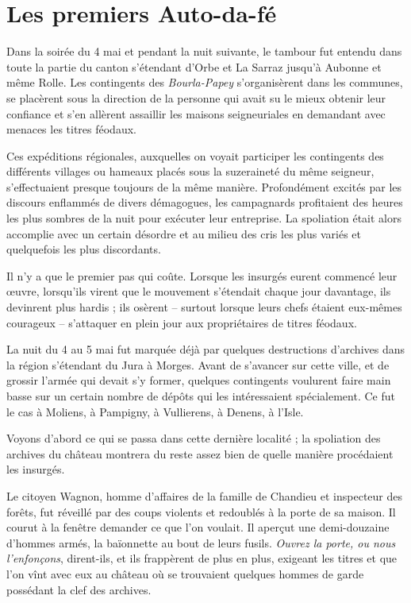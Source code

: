 \documentclass[french,twoside]{book} %
\begin{document}
\section[Les premiers Auto-da-fé]{Les premiers Auto-da-fé}
\noindent Dans la soirée du 4 mai et pendant la nuit suivante, le tambour fut entendu dans toute la partie du canton s’étendant d’Orbe et La Sarraz jusqu’à Aubonne et même Rolle. Les contingents des \emph{Bourla-Papey} s’organisèrent dans les communes, se placèrent sous la direction de la personne qui avait su le mieux obtenir leur confiance et s’en allèrent assaillir les maisons seigneuriales en demandant avec menaces les titres féodaux.\par
Ces expéditions régionales, auxquelles on voyait participer les contingents des différents villages ou hameaux placés sous la suzeraineté du même seigneur, s’effectuaient presque toujours de la même manière. Profondément excités par les discours enflammés de divers démagogues, les campagnards profitaient des heures les plus sombres de la nuit pour exécuter leur entreprise. La spoliation était alors accomplie avec un certain désordre et au milieu des cris les plus variés et quelquefois les plus discordants.\par
Il n’y a que le premier pas qui coûte. Lorsque les insurgés eurent commencé leur œuvre, lorsqu’ils virent que le mouvement s’étendait chaque jour davantage, ils devinrent plus hardis ; ils osèrent – surtout lorsque leurs chefs étaient eux-mêmes courageux – s’attaquer en plein jour aux propriétaires de titres féodaux.\par
La nuit du 4 au 5 mai fut marquée déjà par quelques destructions d’archives dans la région s’étendant du Jura à Morges. Avant de s’avancer sur cette ville, et de grossir l’armée qui devait s’y former, quelques contingents voulurent faire main basse sur un certain nombre de dépôts qui les intéressaient spécialement. Ce fut le cas à Moliens, à Pampigny, à Vullierens, à Denens, à l’Isle.\par
Voyons d’abord ce qui se passa dans cette dernière localité ; la spoliation des archives du château montrera du reste assez bien de quelle manière procédaient les insurgés.\par
Le citoyen Wagnon, homme d’affaires de la famille de Chandieu et inspecteur des forêts, fut réveillé par des coups violents et redoublés à la porte de sa maison. Il courut à la fenêtre demander ce que l’on voulait. Il aperçut une demi-douzaine d’hommes armés, la baïonnette au bout de leurs fusils. \emph{Ouvrez la porte, ou nous l’enfonçons}, dirent-ils, et ils frappèrent de plus en plus, exigeant les titres et que l’on vînt avec eux au château où se trouvaient quelques hommes de garde possédant la clef des archives.\par
\end{document}
